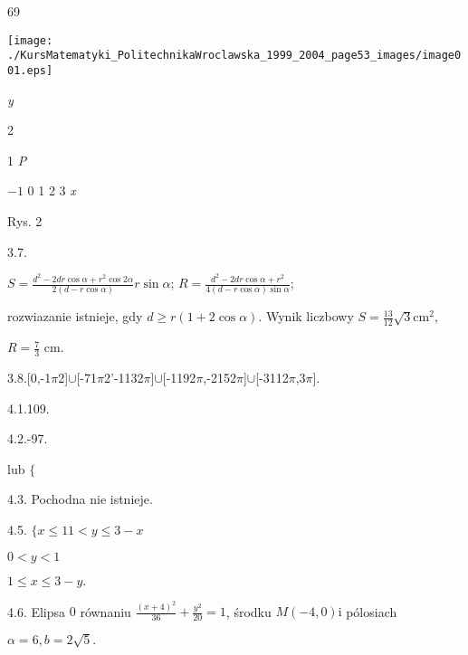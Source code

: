 \documentclass[a4paper,12pt]{article}
\begin{document}
69
\begin{center}
\texttt{[image: ./KursMatematyki\_PolitechnikaWroclawska\_1999\_2004\_page53\_images/image001.eps]}
\end{center}
{\it y}

2

1  {\it P}

$-1$  0 1  2  3 {\it x}

Rys. 2

3.7.

$S = \displaystyle \frac{d^{2}-2dr\cos\alpha+r^{2}\cos 2\alpha}{2(d-r\cos\alpha)}r\sin\alpha$; $R = \displaystyle \frac{d^{2}-2dr\cos\alpha+r^{2}}{4(d-r\cos\alpha)\sin\alpha}$;

rozwiazanie istnieje, gdy $d\geq r(1+2\cos\alpha)$. Wynik liczbowy $S=\displaystyle \frac{13}{12}\sqrt{3}\mathrm{c}\mathrm{m}^{2},$

$R=\displaystyle \frac{7}{3}$ cm.

3.8.[0,-1$\pi$2]$\cup$[-71$\pi$2'-1132$\pi$]$\cup$[-1192$\pi$,-2152$\pi$]$\cup$[-3112$\pi$,3$\pi$].

4.1.109.

4.2.-97.

lub $\{$

4.3. Pochodna nie istnieje.

4.5. $\{x\leq 11<y\leq 3-x$

$0<y<1$

$1\leq x\leq 3-y.$

4.6. Elipsa $0$ równaniu $\displaystyle \frac{(x+4)^{2}}{36}+\frac{y^{2}}{20}=1$, środku $M(-4,0)\mathrm{i}$ pólosiach

$\alpha=6, b=2\sqrt{5}.$
\end{document}
